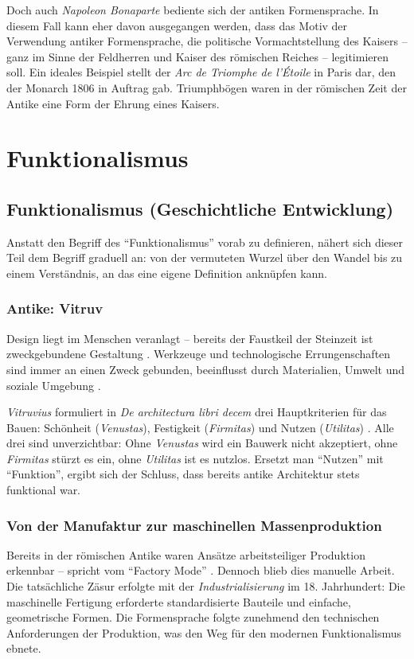 \documentclass[
    a4paper,
    11pt,
    bibliography=totoc,
    listof=totoc,
    parskip=half,
    headings=normal
]{scrbook}
\begin{document}
Doch auch \textit{Napoleon Bonaparte} bediente sich der antiken Formensprache. In diesem Fall kann eher davon ausgegangen werden, dass das Motiv der Verwendung antiker Formensprache, die politische Vormachtstellung des Kaisers -- ganz im Sinne der Feldherren und Kaiser des römischen Reiches -- legitimieren soll. Ein ideales Beispiel stellt der \textit{Arc de Triomphe de l'Étoile} in Paris dar, den der Monarch 1806 in Auftrag gab. Triumphbögen waren in der römischen Zeit der Antike eine Form der Ehrung eines Kaisers.

\chapter{Funktionalismus}

\section{Funktionalismus (Geschichtliche Entwicklung)}
Anstatt den Begriff des \enquote{Funktionalismus} vorab zu definieren, nähert sich dieser Teil dem Begriff graduell an: von der vermuteten Wurzel über den Wandel bis zu einem Verständnis, an das eine eigene Definition anknüpfen kann.

\subsection{Antike: Vitruv}
Design liegt im Menschen veranlagt -- bereits der Faustkeil der Steinzeit ist zweckgebundene Gestaltung \autocite[7\psq]{wurlStudienheftDGUT01Designgeschichte}. Werkzeuge und technologische Errungenschaften sind immer an einen Zweck gebunden, beeinflusst durch Materialien, Umwelt und soziale Umgebung \autocite[9,11]{wurlStudienheftDGUT01Designgeschichte}.

\textit{Vitruvius} formuliert in \textit{De architectura libri decem} drei Hauptkriterien für das Bauen: Schönheit (\textit{Venustas}), Festigkeit (\textit{Firmitas}) und Nutzen (\textit{Utilitas}) \autocite{FirmitasUtilitasUnd}. Alle drei sind unverzichtbar: Ohne \textit{Venustas} wird ein Bauwerk nicht akzeptiert, ohne \textit{Firmitas} stürzt es ein, ohne \textit{Utilitas} ist es nutzlos. Ersetzt man \enquote{Nutzen} mit \enquote{Funktion}, ergibt sich der Schluss, dass bereits antike Architektur stets funktional war.

\subsection{Von der Manufaktur zur maschinellen Massenproduktion}
Bereits in der römischen Antike waren Ansätze arbeitsteiliger Produktion erkennbar -- \citeauthor{peacockPotteryRomanWorld1982} spricht vom \enquote{Factory Mode} \autocite[152-153]{peacockPotteryRomanWorld1982}. Dennoch blieb dies manuelle Arbeit. Die tatsächliche Zäsur erfolgte mit der \textit{Industrialisierung} im 18. Jahrhundert: Die maschinelle Fertigung erforderte standardisierte Bauteile und einfache, geometrische Formen. Die Formensprache folgte zunehmend den technischen Anforderungen der Produktion, was den Weg für den modernen Funktionalismus ebnete.
\end{document}

